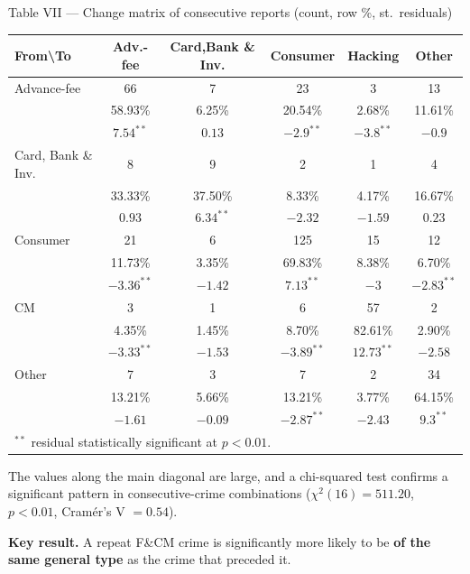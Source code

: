 \documentclass[11pt,a4paper,openany]{report}
\theoremstyle{definition}
\theoremstyle{plain}
\theoremstyle{remark}
\begin{document}
\begin{datapanel}{Table VII --- Change matrix of consecutive reports (count, row \%, st.\ residuals)}
\begin{center}
\begin{tabular}{lccccc}
\toprule
\textbf{From\textbackslash To} & \textbf{Adv.-fee} & \textbf{Card,Bank \& Inv.} & \textbf{Consumer} & \textbf{Hacking} & \textbf{Other} \\
\midrule
Advance-fee   & 66 & 7 & 23 & 3 & 13 \\
              & 58.93\% & 6.25\% & 20.54\% & 2.68\% & 11.61\% \\
              & $7.54^{**}$ & $0.13$ & $-2.9^{**}$ & $-3.8^{**}$ & $-0.9$ \\
\midrule
Card, Bank \& Inv. & 8 & 9 & 2 & 1 & 4 \\
              & 33.33\% & 37.50\% & 8.33\% & 4.17\% & 16.67\% \\
              & $0.93$ & $6.34^{**}$ & $-2.32$ & $-1.59$ & $0.23$ \\
\midrule
Consumer      & 21 & 6 & 125 & 15 & 12 \\
              & 11.73\% & 3.35\% & 69.83\% & 8.38\% & 6.70\% \\
              & $-3.36^{**}$ & $-1.42$ & $7.13^{**}$ & $-3$ & $-2.83^{**}$ \\
\midrule
CM            & 3 & 1 & 6 & 57 & 2 \\
              & 4.35\% & 1.45\% & 8.70\% & 82.61\% & 2.90\% \\
              & $-3.33^{**}$ & $-1.53$ & $-3.89^{**}$ & $12.73^{**}$ & $-2.58$ \\
\midrule
Other         & 7 & 3 & 7 & 2 & 34 \\
              & 13.21\% & 5.66\% & 13.21\% & 3.77\% & 64.15\% \\
              & $-1.61$ & $-0.09$ & $-2.87^{**}$ & $-2.43$ & $9.3^{**}$ \\
\bottomrule
\multicolumn{6}{l}{\footnotesize $^{**}$ residual statistically significant at $p < 0.01$.}
\end{tabular}
\end{center}
\end{datapanel}

The values along the main diagonal are large, and a chi-squared test confirms a significant pattern in consecutive-crime combinations ($\chi^2(16) = 511.20$, $p < 0.01$, Cramér's V $= 0.54$).

\begin{actionbox}
\textbf{Key result.} A repeat F\&CM crime is significantly more likely to be \textbf{of the same general type} as the crime that preceded it.
\end{actionbox}
\end{document}
